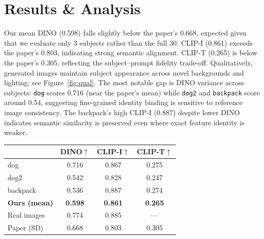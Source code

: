\documentclass[11pt]{article}
\begin{document}
\section{Results \& Analysis}

\noindent
\begin{minipage}[c]{0.48\linewidth}
  Our mean DINO (0.598) falls slightly below the paper's 0.668, expected given that we evaluate only 3 subjects rather than the full 30. CLIP-I (0.861) exceeds the paper's 0.803, indicating strong semantic alignment. CLIP-T (0.265) is below the paper's 0.305, reflecting the subject--prompt fidelity trade-off. Qualitatively, generated images maintain subject appearance across novel backgrounds and lighting; see Figure~\ref{fig:qual}. The most notable gap is DINO variance across subjects: \texttt{dog} scores 0.716 (near the paper's mean) while \texttt{dog2} and \texttt{backpack} score around 0.54, suggesting fine-grained identity binding is sensitive to reference image consistency. The backpack's high CLIP-I (0.887) despite lower DINO indicates semantic similarity is preserved even where exact feature identity is weaker.
\end{minipage}
\hfill
\begin{minipage}[c]{0.48\linewidth}
  \centering
  \small
  \begin{tabular}{lccc}
    \toprule
    & \textbf{DINO}$\uparrow$ & \textbf{CLIP-I}$\uparrow$ & \textbf{CLIP-T}$\uparrow$ \\
    \midrule
    dog              & 0.716 & 0.867 & 0.275 \\
    dog2             & 0.542 & 0.828 & 0.247 \\
    backpack         & 0.536 & 0.887 & 0.274 \\
    \midrule
    \textbf{Ours (mean)} & \textbf{0.598} & \textbf{0.861} & \textbf{0.265} \\
    \midrule
    Real images      & 0.774 & 0.885 & --- \\
    Paper (SD)       & 0.668 & 0.803 & 0.305 \\
    \bottomrule
  \end{tabular}
  \label{tab:metrics}
\end{minipage}
\end{document}
